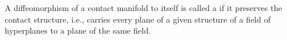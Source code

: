 A diffeomorphism of a contact manifold to itself is called a  if it preserves the contact structure, i.e., carries every plane of a given structure of a field of hyperplanes to a plane of the same field.
